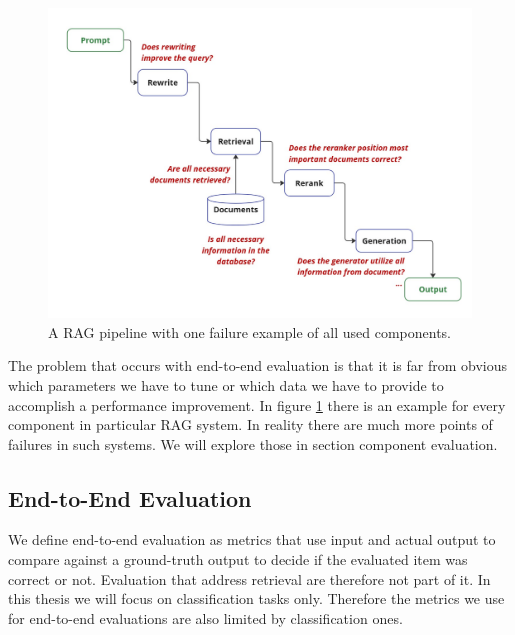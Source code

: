\begin{figure}
  \centering
  \includegraphics[width=\textwidth]{images/FailurePointExamples.pdf}
  \caption{A RAG pipeline with one failure example of all used components.}
  \label{fig:failures}
\end{figure}

The problem that occurs with end-to-end evaluation is that it is far from obvious which parameters we have to tune or which data we have to provide to accomplish a performance improvement. In figure \ref{fig:failures} there is an example for every component in particular RAG system. In reality there are much more points of failures in such systems. We will explore those in section component evaluation.

\subsection{End-to-End Evaluation}

We define end-to-end evaluation as metrics that use input and actual output to compare against a ground-truth output to decide if the evaluated item was correct or not. Evaluation that address retrieval are therefore not part of it. In this thesis we will focus on classification tasks only. Therefore the metrics we use for end-to-end evaluations are also limited by classification ones. 

